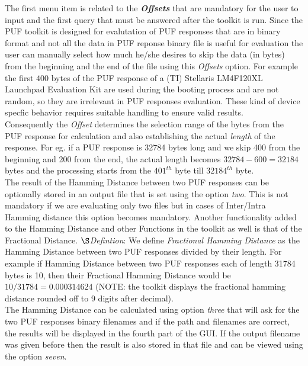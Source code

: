 The first menu item is related to the \emph{\textbf{Offsets}} that are mandatory for the user to input and the first query that must be answered after the toolkit is run. Since the PUF toolkit is designed for evalutation of PUF responses that are in binary format and not all the data in PUF reponse binary file is useful for evaluation the user can manually select how much he/she desires to skip the data (in bytes) from the beginning and the end of the file using this \emph{Offsets} option.
For example the first $400$ bytes of the PUF response of a (TI) Stellaris LM4F120XL Launchpad Evaluation Kit are used during the booting process and are not random, so they are irrelevant in PUF responses evaluation. These kind of device specfic behavior requires suitable handling to ensure valid results.\\

Consequently the \emph{Offset} determines the selection range of the bytes from the PUF response for calculation and also establishing the actual \emph{length} of the response. For eg. if a PUF response is 32784 bytes long and we skip 400 from the beginning and 200 from the end, the actual length becomes $32784-600 = 32184$ bytes and the processing starts from the $401^{th}$ byte till $32184^{th}$ byte.\\

The result of the Hamming Distance between two PUF responses can be optionally stored in an output file that is set using the option \emph{two}. This is not mandatory if we are evaluating only two files but in cases of Inter/Intra Hamming distance this option becomes mandatory. Another functionality added to the Hamming Distance and other Functions in the toolkit as well is that of the Fractional Distance. \newline
$\S$\emph{Defintion}: We define \emph{Fractional Hamming Distance} as the Hamming Distance between two PUF
responses divided by their length. For example if Hamming Distance between two PUF responses each of length 31784 bytes is 10, then their Fractional Hamming Distance would be $ 10 / 31784 = 0.000314624$ (NOTE: the toolkit displays the fractional hamming distance rounded off to 9 digits after decimal).\\

The Hamming Distance can be calculated using option \emph{three} that will ask for the two PUF responses binary filenames and if the path and filenames are correct, the results will be displayed in the fourth part of the GUI. If the output filename was given before then the result is also stored in that file and can be viewed using the option \emph{seven}.\\

